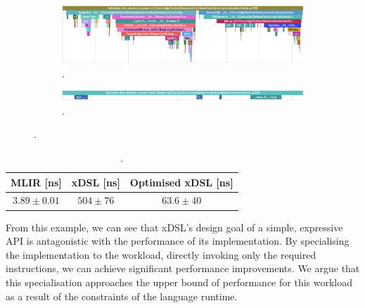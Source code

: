 \begin{figure}[H]
    \centering
    \begin{subfigure}[b]{\textwidth}
        \centering
        \includegraphics[width=\textwidth]{images/specialising_optimising_xdsl_rewriting/original_constant_create.png}
        \captionsetup{width=0.8\textwidth}
        \caption{.}
        \label{fig:ubenchmark-hastrait-xdsl-viztracer}
    \end{subfigure}
    \begin{subfigure}[b]{\textwidth}
        \centering
        \includegraphics[width=\textwidth]{images/specialising_optimising_xdsl_rewriting/optimised_constant_create.png}
        \captionsetup{width=0.8\textwidth}
        \caption{.}
        \label{fig:ubenchmark-gettrait-xdsl-viztracer}
    \end{subfigure}
    \caption{.}
    \label{fig:ubenchmark-hasgettrait-xdsl-viztracer}
\end{figure}

\begin{table}[H]
  \caption{.}
  \label{tab:ubenchmark-instantiation-optimised}
  \centering
  \begin{tabular}{ccc}
    \toprule
    \textbf{MLIR [ns]} & \textbf{xDSL [ns]} & \textbf{Optimised xDSL [ns]} \\
    \midrule
    $3.89 \pm 0.01$ & $504 \pm 76$ & $63.6 \pm 40$\\
    \bottomrule
  \end{tabular}
\end{table}

From this example, we can see that xDSL's design goal of a simple, expressive API is antagonistic with the performance of its implementation. By specialising the implementation to the workload, directly invoking only the required instructions, we can achieve significant performance improvements. We argue that this specialisation approaches the upper bound of performance for this workload as a result of the constraints of the language runtime.










